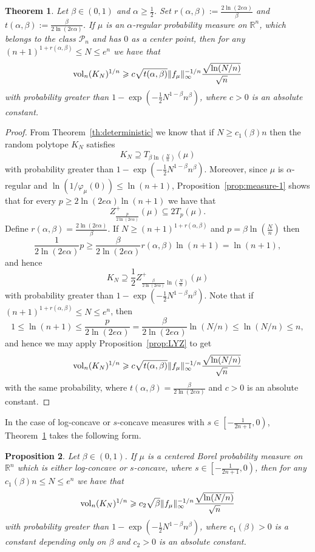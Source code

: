 \documentclass[11pt,leqno]{article}
\newtheorem{theorem}{Theorem}[section]
\newtheorem{proposition}[theorem]{Proposition}
\theoremstyle{definition}
\theoremstyle{remark}
\numberwithin{equation}{section}
\newcommand{\vol}{{\rm vol}}
\newcommand{\ls}{\leqslant}
\newcommand{\gr}{\geqslant}
\newcommand{\1}{\textbf{1}}
\begin{document}
\begin{theorem}\label{th:alpha-volume}Let $\beta\in (0,1)$ and $\alpha\gr\frac{1}{2}$. Set
$r(\alpha,\beta):=\frac{2\ln(2e\alpha)}{\beta}$ and $t(\alpha,\beta):=\frac{\beta}{2\ln(2e\alpha)}$.
If $\mu $ is an $\alpha$-regular probability measure on ${\mathbb R}^n$, which belongs to
the class $\mathcal{P}_n$ and has $0$ as a center point, then
for any $(n+1)^{1+r(\alpha,\beta)}\ls N\ls e^n$ we have that
$$\vol_n(K_N)^{1/n}\gr c \sqrt{t(\alpha,\beta)}\|f_{\mu}\|_{\infty}^{-1/n}\frac{\sqrt{\ln(N/n)}}{\sqrt{n}}$$
with probability greater than $1-\exp(-\tfrac{1}{2}N^{1-\beta}n^{\beta})$, where $c>0$ is an absolute constant.
\end{theorem}

\begin{proof}From Theorem~\ref{th:deterministic} we know that if $N\gr c_1(\beta)n$ then
the random polytope $K_N$ satisfies
$$K_N\supseteq T_{\beta\ln\left(\frac{N}{n}\right)}(\mu)$$
with probability greater than $1-\exp(-\tfrac{1}{2}N^{1-\beta}n^{\beta})$.
Moreover, since $\mu$ is $\alpha$-regular and $\ln(1/\varphi_{\mu}(0))\ls\ln (n+1)$,
Proposition~\ref{prop:measure-1} shows that for every $p\gr 2\ln(2e\alpha)\ln (n+1)$ we have that
$$Z_{\frac{p}{2\ln(2e\alpha)}}^+(\mu)\subseteq 2T_p(\mu).$$
Define $r(\alpha,\beta)=\frac{2\ln(2e\alpha)}{\beta}$. If $N\gr (n+1)^{1+r(\alpha,\beta)}$
and $p=\beta\ln\left(\frac{N}{n}\right)$ then
$$\frac{1}{2\ln(2e\alpha)}p\gr\frac{\beta}{2\ln(2e\alpha)}r(\alpha,\beta)\ln (n+1)= \ln(n+1),$$ and hence
$$K_N\supseteq \frac{1}{2} Z_{\frac{\beta}{2\ln(2e\alpha)}\ln\left(\frac{N}{n}\right)}^+(\mu)$$
with probability greater than $1-\exp(-\tfrac{1}{2}N^{1-\beta}n^{\beta})$.
Note that if $(n+1)^{1+r(\alpha,\beta)}\ls N\ls e^n$, then
$$1\ls \ln (n+1)\ls\frac{p}{2\ln(2e\alpha)}=\frac{\beta}{2\ln(2e\alpha)}\ln(N/n)
\ls\ln(N/n)\ls n,$$ and hence we may apply Proposition~\ref{prop:LYZ} to get
$$\vol_n(K_N)^{1/n}\gr c \sqrt{t(\alpha,\beta)}\|f_{\mu}\|_{\infty}^{-1/n}\frac{\sqrt{\ln(N/n)}}{\sqrt{n}}$$
with the same probability, where $t(\alpha,\beta)=\frac{\beta}{2\ln(2e\alpha)}$ and $c>0$ is an absolute constant.
\end{proof}

In the case of log-concave or $s$-concave measures with $s \in \left[-\frac{1}{2n+1},0\right)$, Theorem~\ref{th:alpha-volume}
takes the following form.

\begin{proposition}\label{prop:kconc} Let $\beta \in (0,1)$. If $\mu$ is a centered Borel probability measure on $\mathbb{R}^n$ which is either log-concave or $s$-concave, where $s \in \left[-\frac{1}{2n+1},0\right)$, then for any $c_1(\beta)n \ls N \ls e^n$ we have that
$$\vol_n(K_N)^{1/n}\gr c_2 \sqrt{\beta} \|f_{\mu}\|_{\infty}^{-1/n}\frac{\sqrt{\ln(N/n)}}{\sqrt{n}}$$
with probability greater than $1-\exp(-\tfrac{1}{2}N^{1-\beta}n^{\beta})$, where $c_1(\beta)>0$ is a constant depending only on $\beta$ and $c_2>0$ is an absolute constant.
\end{proposition}
\end{document}
